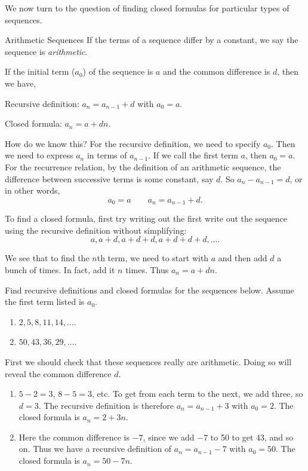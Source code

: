 \documentclass[12pt]{article}
\begin{document}
We now turn to the question of finding closed formulas for particular types of sequences.

\begin{defbox}{Arithmetic Sequences}
  If the terms of a sequence differ by a constant, we say the sequence is {\em arithmetic}.
  
  If the initial term ($a_0$) of the sequence is $a$ and the common difference is $d$, then we have,
  
  Recursive definition: $a_n = a_{n-1} + d$ with $a_0 = a$.
  
  Closed formula: $a_n = a + dn$.
\end{defbox}

How do we know this? For the recursive definition, we need to specify $a_0$.  Then we need to express $a_n$ in terms of $a_{n-1}$.  If we call the first term $a$, then $a_0 = a$.  For the recurrence relation, by the definition of an arithmetic sequence, the difference between successive terms is some constant, say $d$.  So $a_n - a_{n-1} = d$, or in other words, \[ a_0 = a \qquad a_n=a_{n-1}+d.\]

To find a closed formula, first try writing out the first write out the sequence using the recursive definition without simplifying:
\[a, a+d, a+d+d, a+d+d+d, \ldots.\]

We see that to find the $n$th term, we need to start with $a$ and then add $d$ a bunch of times. In fact, add it $n$ times.  Thus $a_n = a+dn$.  

\begin{example}
  Find recursive definitions and closed formulas for the sequences below.  Assume the first term listed is $a_0$.
  \begin{enumerate}
  \item $2, 5, 8, 11, 14, \ldots$.
    \item $50, 43, 36, 29, \ldots$.
    
  \end{enumerate}
  \begin{solution}
  First we should check that these sequences really are arithmetic.  Doing so will reveal the common difference $d$.
    \begin{enumerate}
      \item $5-2 = 3$, $8-5 = 3$, etc.  To get from each term to the next, we add three, so $d = 3$.  The recursive definition is therefore $a_n = a_{n-1} + 3$ with $a_0 = 2$.  The closed formula is $a_n = 2 + 3n$.
      \item Here the common difference is $-7$, since we add $-7$ to 50 to get 43, and so on.  Thus we have a recursive definition of $a_n = a_{n-1} - 7$ with $a_0 = 50$.  The closed formula is $a_n = 50 - 7n$.
    \end{enumerate}

  \end{solution}

\end{example}
\end{document}
